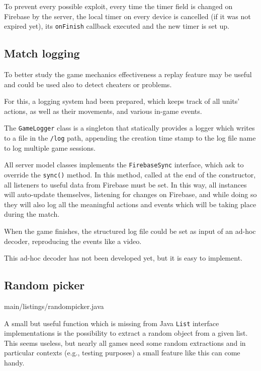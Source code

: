 			To prevent every possible exploit, every time the timer field is changed on Firebase by the server, the local timer on every device is cancelled (if it was not expired yet), its \lstinline|onFinish| callback executed and the new timer is set up.
		
		\subsection{Match logging}\label{focus:log}
		
			To better study the game mechanics effectiveness a replay feature may be useful and could be used also to detect cheaters or problems.
			
			For this, a logging system had been prepared, which keeps track of all units' actions, as well as their movements, and various in-game events.
			
			The \lstinline|GameLogger| class is a singleton that statically provides a logger which writes to a file in the \lstinline|/log| path, appending the creation time stamp to the log file name to log multiple game sessions.
			
			All server model classes implements the \lstinline|FirebaseSync| interface, which ask to override the \lstinline|sync()| method.
			In this method, called at the end of the constructor, all listeners to useful data from Firebase must be set.
			In this way, all instances will auto-update themselves, listening for changes on Firebase, and while doing so they will also log all the meaningful actions and events which will be taking place during the match.
			
			When the game finishes, the structured log file could be set as input of an ad-hoc decoder, reproducing the events like a video.
			
			This ad-hoc decoder has not been developed yet, but it is easy to implement. 
		
		\subsection{Random picker}\label{focus:picker}
		
			
							{main/listings/randompicker.java}
			
			A small but useful function which is missing from Java \lstinline|List| interface implementations is the possibility to extract a random object from a given list.
			This seems useless, but nearly all games need some random extractions and in particular contexts (e.g., testing purposes) a small feature like this can come handy.
			
